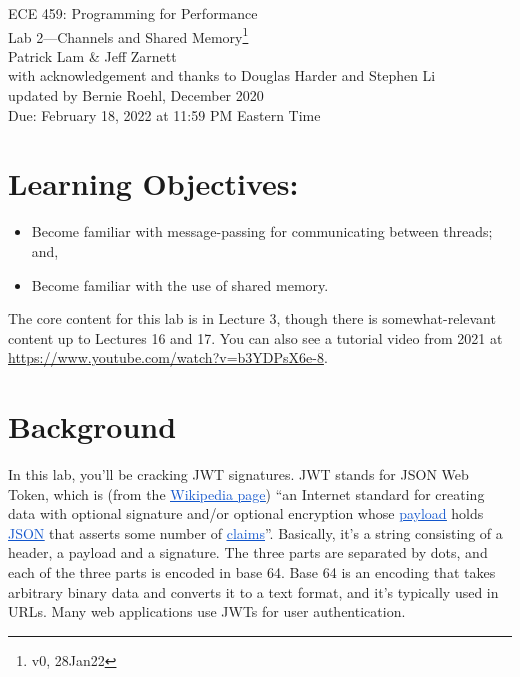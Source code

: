 \documentclass[12pt]{article}
\renewcommand{\_}{\kern-1.5pt\textunderscore\kern-1.5pt}
\begin{document}
\begin{center}
{\Large ECE 459: Programming for Performance}\\
{\Large Lab 2---Channels and Shared Memory\footnote{v0, 28Jan22}}\\[1em]
Patrick Lam \& Jeff Zarnett\\
with acknowledgement and thanks to Douglas Harder and Stephen Li\\
updated by Bernie Roehl, December 2020\\
Due: February 18, 2022 at 11:59 PM Eastern Time
\end{center}

\section*{Learning Objectives:}

\begin{itemize}[noitemsep]
	\item Become familiar with message-passing for communicating between threads; and,
	\item Become familiar with the use of shared memory.
\end{itemize}

The core content for this lab is in Lecture 3, though there is somewhat-relevant content up to Lectures 16 and 17. You can also see a tutorial video from 2021 at \url{https://www.youtube.com/watch?v=b3YDPsX6e-8}.

\section*{Background}

In this lab, you’ll be cracking JWT signatures. JWT stands for JSON Web Token, which is (from the \href{https://en.wikipedia.org/wiki/JSON_Web_Token}{\textcolor[HTML]{1155CC}{\ul{Wikipedia page}}}) ``an Internet standard for creating data with optional signature and/or optional encryption whose \href{https://en.wikipedia.org/wiki/Payload_(computing)}{\textcolor[HTML]{1155CC}{\ul{payload}}} holds \href{https://en.wikipedia.org/wiki/JSON}{\textcolor[HTML]{1155CC}{\ul{JSON}}} that asserts some number of \href{https://en.wikipedia.org/wiki/Claims-based_identity}{\textcolor[HTML]{1155CC}{\ul{claims}}}''. Basically, it’s a string consisting of a header, a payload and a signature. The three parts are separated by dots, and each of the three parts is encoded in base 64. Base 64 is an encoding that takes arbitrary binary data and converts it to a text format, and it’s typically used in URLs.  Many web applications use JWTs for user authentication. \par
\end{document}
